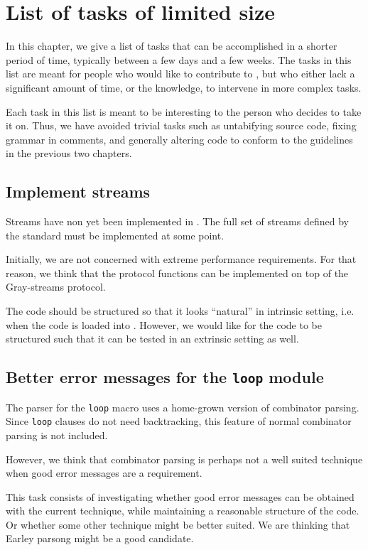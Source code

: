 \chapter{List of tasks of limited size}

In this chapter, we give a list of tasks that can be accomplished in a
shorter period of time, typically between a few days and a few weeks.
The tasks in this list are meant for people who would like to
contribute to \sysname{}, but who either lack a significant amount of
time, or the knowledge, to intervene in more complex tasks.

Each task in this list is meant to be interesting to the person who
decides to take it on.  Thus, we have avoided trivial tasks such as
untabifying source code, fixing grammar in comments, and generally
altering code to conform to the guidelines in the previous two
chapters.

\section{Implement streams}

Streams have non yet been implemented in \sysname{}.  The full set of
streams defined by the standard must be implemented at some point.

Initially, we are not concerned with extreme performance
requirements.  For that reason, we think that the protocol functions
can be implemented on top of the Gray-streams protocol.

The code should be structured so that it looks ``natural'' in
intrinsic setting, i.e. when the code is loaded into \sysname{}.
However, we would like for the code to be structured such that it can
be tested in an extrinsic setting as well.

\section{Better error messages for the \texttt{loop} module}

The parser for the \texttt{loop} macro uses a home-grown version of
combinator parsing.  Since \texttt{loop} clauses do not need
backtracking, this feature of normal combinator parsing is not
included.

However, we think that combinator parsing is perhaps not a well suited
technique when good error messages are a requirement.

This task consists of investigating whether good error messages can be
obtained with the current technique, while maintaining a reasonable
structure of the code.  Or whether some other technique might be
better suited.  We are thinking that Earley parsong might be a good
candidate.

